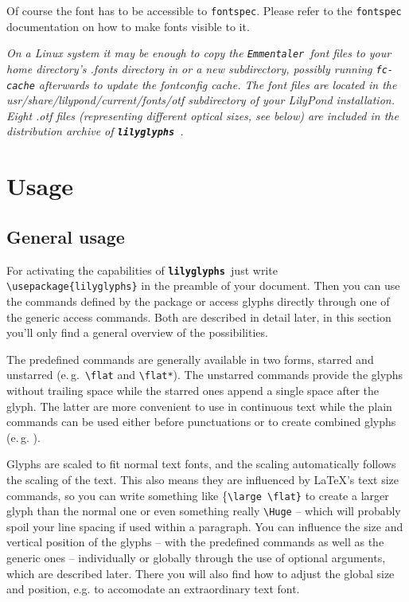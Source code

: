 \documentclass{article}
\newcommand*{\lilyglyphs}{\texttt{\textbf{lilyglyphs\,}}}
\newcommand*{\emmentaler}{\texttt{\textit{Emmentaler }}}
\newcommand*{\cmd}[1]{\texttt{\textbackslash #1}}
\begin{document}
Of course the font has to be accessible to \texttt{fontspec}. 
Please refer to the \texttt{fontspec} documentation on how to make fonts visible to it. 

\textit{On a Linux system it may be enough to copy the \emmentaler font files to your home directory's .fonts directory in or a new subdirectory, possibly running \texttt{fc-cache} afterwards to update the fontconfig cache. 
The font files are located in the usr/share/lilypond/current/fonts/otf subdirectory of your LilyPond installation. 
Eight .otf files (representing different optical sizes, see below) are included in the distribution archive of \lilyglyphs.}



\section{Usage}
\subsection{General usage}
For activating the capabilities of \lilyglyphs just write \cmd{usepackage\{lilyglyphs\}} in the preamble of your document. 
Then you can use the commands defined by the package or access glyphs directly through one of the generic access commands.
Both are described in detail later, in this section you'll only find a general overview of the possibilities.

The predefined commands are generally available in two forms, starred and unstarred (e.\,g.\ \cmd{flat} and \cmd{flat*}). 
The unstarred commands provide the glyphs without trailing space while the starred ones append a single space after the glyph. 
The latter are more convenient to use in continuous text while the plain commands can be used either before punctuations or to create combined glyphs (e.\,g. ).

Glyphs are scaled to fit normal text fonts, and the scaling automatically follows the scaling of the text. 
This also means they are influenced by \LaTeX 's text size commands, so you can write something like \{\cmd{large \textbackslash flat\}} to create a larger {\large \flat} glyph than the normal \flat* one or even something really \cmd{Huge} {\Huge {}} -- which will probably spoil your line spacing if used within a paragraph. 
You can influence the size and vertical position of the glyphs -- with the predefined commands as well as the generic ones -- individually or globally through the use of optional arguments, which are described later.
There you will also find how to adjust the global size and position, e.g. to accomodate an extraordinary text font.
\end{document}
